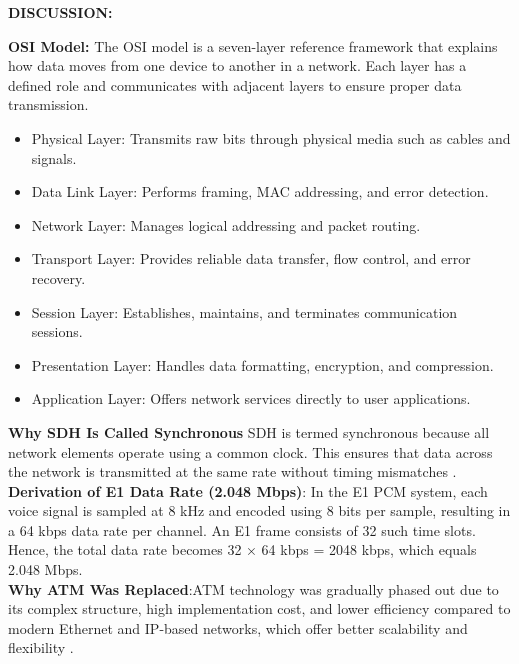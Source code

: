 \documentclass[a4paper,12pt]{article}
\begin{document}
\noindent
\textbf{DISCUSSION:}

\noindent
\textbf{OSI Model: }The OSI model is a seven-layer reference framework that explains how data moves from one device to another in a network. Each layer has a defined role and communicates with adjacent layers to ensure proper data transmission\cite{geeksforgeeks_osi_model}.\\

\begin{itemize}
    \item Physical Layer: Transmits raw bits through physical media such as cables and signals.
    \item Data Link Layer: Performs framing, MAC addressing, and error detection.
    \item Network Layer: Manages logical addressing and packet routing.
    \item Transport Layer: Provides reliable data transfer, flow control, and error recovery.
    \item Session Layer: Establishes, maintains, and terminates communication sessions.
    \item Presentation Layer: Handles data formatting, encryption, and compression.
    \item Application Layer: Offers network services directly to user applications.
\end{itemize}

\noindent
\textbf{Why SDH Is Called Synchronous} SDH is termed synchronous because all network elements operate using a common clock. This ensures that data across the network is transmitted at the same rate without timing mismatches \cite{vasexperts_sdh_glossary}.\\

\noindent
\textbf{Derivation of E1 Data Rate (2.048 Mbps)}: In the E1 PCM system, each voice signal is sampled at 8 kHz and encoded using 8 bits per sample, resulting in a 64 kbps data rate per channel. An E1 frame consists of 32 such time slots. Hence, the total data rate becomes
32 × 64 kbps = 2048 kbps, which equals 2.048 Mbps. \\

\noindent
\textbf{Why ATM Was Replaced}:ATM technology was gradually phased out due to its complex structure, high implementation cost, and lower efficiency compared to modern Ethernet and IP-based networks, which offer better scalability and flexibility \cite{geeksforgeeks_atm_computer_network}.\\
\end{document}
